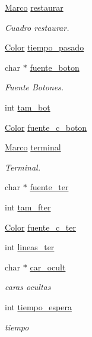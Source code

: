 \begin{CompactItemize}
\hyperlink{class_marco}{Marco} \hyperlink{class_config_25cedb2b9bacdadfa4e138d93d621653}{restaurar}
\begin{CompactList}\small\item\em Cuadro restaurar. \item\end{CompactList}\item 
\hyperlink{struct_color}{Color} \hyperlink{class_config_d522e3624b073006515daeeb2a7b6bc1}{tiempo\_\-pasado}
\item 
char $\ast$ \hyperlink{class_config_fb529bc47d1bf967f429261d57da7786}{fuente\_\-boton}
\begin{CompactList}\small\item\em Fuente Botones. \item\end{CompactList}\item 
int \hyperlink{class_config_aa23e90f3ee9ef5b23e6381bc51aa58a}{tam\_\-bot}
\item 
\hyperlink{struct_color}{Color} \hyperlink{class_config_10426677e6f5a372ddf4bfea5da6f3d6}{fuente\_\-c\_\-boton}
\item 
\hyperlink{class_marco}{Marco} \hyperlink{class_config_566edeb58b797aac802596fedd9e133b}{terminal}
\begin{CompactList}\small\item\em Terminal. \item\end{CompactList}\item 
char $\ast$ \hyperlink{class_config_a384377656d83174474d2a3db85b9b53}{fuente\_\-ter}
\item 
int \hyperlink{class_config_4ed61ba67371ab3b4e796f6c085c970d}{tam\_\-fter}
\item 
\hyperlink{struct_color}{Color} \hyperlink{class_config_58b22a3c2857d0bde659cdf22642b654}{fuente\_\-c\_\-ter}
\item 
int \hyperlink{class_config_8c8a659e2f3e0e8ea61e719a4b0138f7}{lineas\_\-ter}
\item 
char $\ast$ \hyperlink{class_config_1232c4b290f0ab28e04eec3b6ca702e3}{car\_\-ocult}
\begin{CompactList}\small\item\em caras ocultas \item\end{CompactList}\item 
int \hyperlink{class_config_8f0e117c12295f853e0f39cb82bddad5}{tiempo\_\-espera}
\begin{CompactList}\small\item\em tiempo \item\end{CompactList}\end{CompactItemize}
